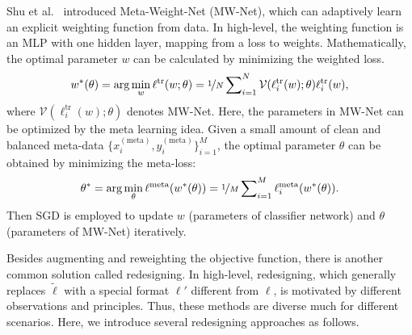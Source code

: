 Shu et al.~ introduced Meta-Weight-Net (MW-Net), which can adaptively learn an explicit weighting function from data. 
In high-level, 
the weighting function is an MLP with one hidden layer, mapping from a loss to weights. 
Mathematically, the optimal parameter $w$ can be calculated by minimizing the weighted loss.
\begin{align*}
w^*(\theta) 
= \arg\min_{w}\mathcal{\ell}^{\text{tr}}(w;\theta)
= \nicefrac{1}{N}\sum\nolimits_{i=1}^{N}\mathcal{V}(\ell_i^{\text{tr}}(w);\theta)\ell_i^{\text{tr}}(w),
\end{align*}
where $\mathcal{V}(\ell_i^{\text{tr}}(w);\theta)$ denotes MW-Net.
Here, the parameters in MW-Net can be optimized by the meta learning idea. Given a small amount of clean and balanced meta-data $\{x_i^{(\text{meta})},y_i^{(\text{meta})}\}_{i=1}^M$, the optimal parameter $\theta$ can be obtained by minimizing the meta-loss:
\begin{align*}
\theta^* 
= \arg\min_{\theta}\ell^{\text{meta}}(w^*(\theta))
=\nicefrac{1}{M}\sum\nolimits_{i=1}^{M}\ell_i^{\text{meta}}(w^*(\theta)).
\end{align*}
Then SGD is employed to update $w$ (parameters of classifier network) and $\theta$ (parameters of MW-Net) iteratively.

Besides augmenting and reweighting the objective function, there is another common solution called redesigning. 
In high-level, redesigning,
which generally replaces $\tilde{\ell}$ with a special format $\ell'$
different  from $\ell$,
is motivated by different observations and principles.
Thus,
these methods are diverse much for different scenarios. Here, we introduce several redesigning approaches as follows.

